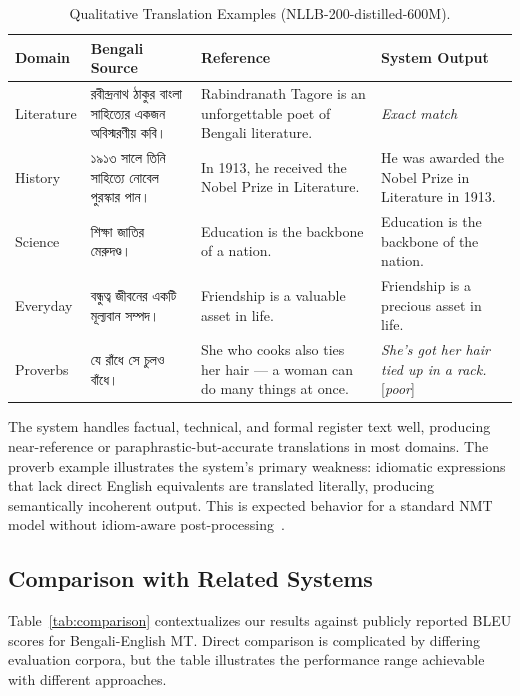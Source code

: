 \documentclass[conference]{IEEEtran}
\begin{document}
\begin{table}[htbp]
\caption{Qualitative Translation Examples (NLLB-200-distilled-600M).}
\label{tab:qualitative}
\centering
\small
\begin{tabular}{p{} p{} p{} p{}}
\toprule
\textbf{Domain} & \textbf{Bengali Source} & \textbf{Reference} & \textbf{System Output} \\
\midrule
Literature &
  রবীন্দ্রনাথ ঠাকুর বাংলা সাহিত্যের একজন অবিস্মরণীয় কবি। &
  Rabindranath Tagore is an unforgettable poet of Bengali literature. &
  \textit{Exact match} \\
\addlinespace
History &
  ১৯১৩ সালে তিনি সাহিত্যে নোবেল পুরস্কার পান। &
  In 1913, he received the Nobel Prize in Literature. &
  He was awarded the Nobel Prize in Literature in 1913. \\
\addlinespace
Science &
  শিক্ষা জাতির মেরুদণ্ড। &
  Education is the backbone of a nation. &
  Education is the backbone of the nation. \\
\addlinespace
Everyday &
  বন্ধুত্ব জীবনের একটি মূল্যবান সম্পদ। &
  Friendship is a valuable asset in life. &
  Friendship is a precious asset in life. \\
\addlinespace
Proverbs &
  যে রাঁধে সে চুলও বাঁধে। &
  She who cooks also ties her hair --- a woman can do many things at once. &
  \textit{She's got her hair tied up in a rack.} [\emph{poor}] \\
\bottomrule
\end{tabular}
\end{table}

The system handles factual, technical, and formal register text well, producing
near-reference or paraphrastic-but-accurate translations in most domains.
The proverb example illustrates the system's primary weakness: idiomatic expressions
that lack direct English equivalents are translated literally, producing semantically
incoherent output. This is expected behavior for a standard NMT model without
idiom-aware post-processing~\cite{fadaee2017data}.

\subsection{Comparison with Related Systems}

Table~\ref{tab:comparison} contextualizes our results against publicly reported
BLEU scores for Bengali-English MT.
Direct comparison is complicated by differing evaluation corpora, but the table
illustrates the performance range achievable with different approaches.
\end{document}
